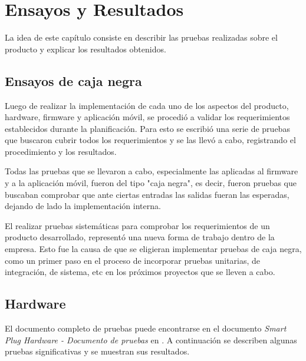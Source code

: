 
\chapter{Ensayos y Resultados} %

\label{Chapter4} %


La idea de este capítulo consiste en describir las pruebas realizadas sobre el producto y explicar los resultados obtenidos.

\section{Ensayos de caja negra}

Luego de realizar la implementación de cada uno de los aspectos del producto, hardware, firmware y aplicación móvil, se procedió a validar los requerimientos establecidos durante la planificación. Para esto se escribió una serie de pruebas que buscaron cubrir todos los requerimientos y se las llevó a cabo, registrando el procedimiento y los resultados.

Todas las pruebas que se llevaron a cabo, especialmente las aplicadas al firmware y a la aplicación móvil, fueron del tipo "caja negra", es decir, fueron pruebas que buscaban comprobar que ante ciertas entradas las salidas fueran las esperadas, dejando de lado la implementación interna.

El realizar pruebas sistemáticas para comprobar los requerimientos de un producto desarrollado, representó una nueva forma de trabajo dentro de la empresa. Esto fue la causa de que se eligieran implementar pruebas de caja negra, como un primer paso en el proceso de incorporar pruebas unitarias, de integración, de sistema, etc en los próximos proyectos que se lleven a cabo.

\section{Hardware}

El documento completo de pruebas puede encontrarse en el documento \textit{Smart Plug Hardware - Documento de pruebas} en \citep{repo_hardware}. A continuación se describen algunas pruebas significativas y se muestran sus resultados.

